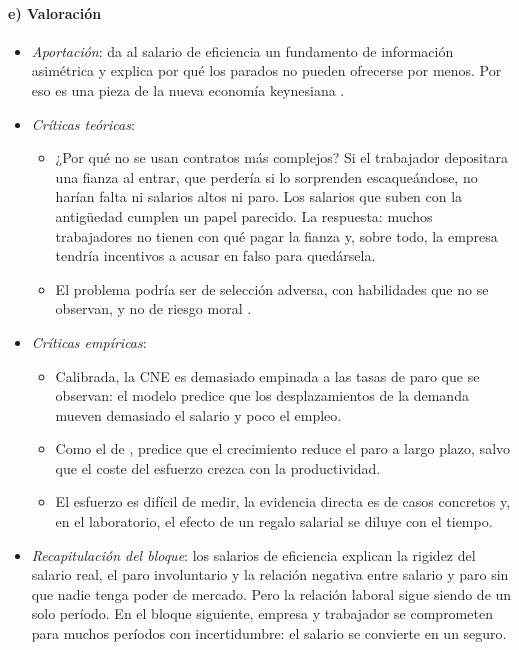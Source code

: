 \documentclass[11pt]{article}
\begin{document}
\paragraph{e) Valoración}

\begin{itemize}
\item \emph{Aportación}: da al salario de eficiencia un fundamento de información asimétrica y explica por qué los parados no pueden ofrecerse por menos. Por eso es una pieza de la nueva economía keynesiana .
\item \emph{Críticas teóricas}:
  \begin{itemize}
  \item ¿Por qué no se usan contratos más complejos? Si el trabajador depositara una fianza al entrar, que perdería si lo sorprenden escaqueándose, no harían falta ni salarios altos ni paro\nocite{Carmichael1985Can}. Los salarios que suben con la antigüedad cumplen un papel parecido\nocite{Lazear1979Why}. La respuesta: muchos trabajadores no tienen con qué pagar la fianza y, sobre todo, la empresa tendría incentivos a acusar en falso para quedársela\nocite{ShapiroStiglitz1984Equilibrium,ShapiroStiglitz1985Can}.
  \item El problema podría ser de selección adversa, con habilidades que no se observan, y no de riesgo moral .
  \end{itemize}
\item \emph{Críticas empíricas}:
  \begin{itemize}
  \item Calibrada, la CNE es demasiado empinada a las tasas de paro que se observan: el modelo predice que los desplazamientos de la demanda mueven demasiado el salario y poco el empleo.
  \item Como el de , predice que el crecimiento reduce el paro a largo plazo, salvo que el coste del esfuerzo crezca con la productividad\nocite{Romer2019Advanced}.
  \item El esfuerzo es difícil de medir, la evidencia directa es de casos concretos y, en el laboratorio, el efecto de un regalo salarial se diluye con el tiempo\nocite{GneezyList2006Putting}.
  \end{itemize}
\item \emph{Recapitulación del bloque}: los salarios de eficiencia explican la rigidez del salario real, el paro involuntario y la relación negativa entre salario y paro sin que nadie tenga poder de mercado. Pero la relación laboral sigue siendo de un solo período. En el bloque siguiente, empresa y trabajador se comprometen para muchos períodos con incertidumbre: el salario se convierte en un seguro.
\end{itemize}
\end{document}
